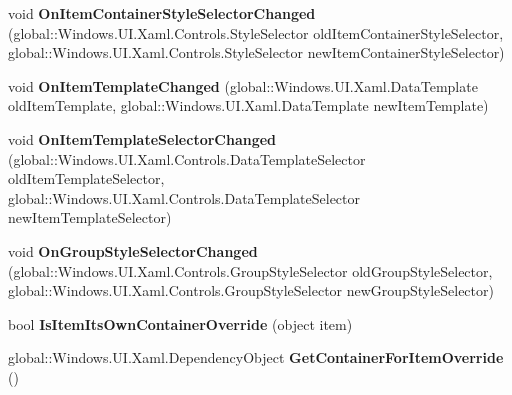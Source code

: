 \begin{DoxyCompactItemize}
void {\bfseries On\+Item\+Container\+Style\+Selector\+Changed} (global\+::\+Windows.\+U\+I.\+Xaml.\+Controls.\+Style\+Selector old\+Item\+Container\+Style\+Selector, global\+::\+Windows.\+U\+I.\+Xaml.\+Controls.\+Style\+Selector new\+Item\+Container\+Style\+Selector)
\item 
\mbox{\label{interface_windows_1_1_u_i_1_1_xaml_1_1_controls_1_1_i_items_control_overrides_ac592214833c559a28551ba9ccb0b4d2a}} 
void {\bfseries On\+Item\+Template\+Changed} (global\+::\+Windows.\+U\+I.\+Xaml.\+Data\+Template old\+Item\+Template, global\+::\+Windows.\+U\+I.\+Xaml.\+Data\+Template new\+Item\+Template)
\item 
\mbox{\label{interface_windows_1_1_u_i_1_1_xaml_1_1_controls_1_1_i_items_control_overrides_a30660077603ff4ebf8b8f749780afbd1}} 
void {\bfseries On\+Item\+Template\+Selector\+Changed} (global\+::\+Windows.\+U\+I.\+Xaml.\+Controls.\+Data\+Template\+Selector old\+Item\+Template\+Selector, global\+::\+Windows.\+U\+I.\+Xaml.\+Controls.\+Data\+Template\+Selector new\+Item\+Template\+Selector)
\item 
\mbox{\label{interface_windows_1_1_u_i_1_1_xaml_1_1_controls_1_1_i_items_control_overrides_ac04335f529637477b2da0ba46ef61142}} 
void {\bfseries On\+Group\+Style\+Selector\+Changed} (global\+::\+Windows.\+U\+I.\+Xaml.\+Controls.\+Group\+Style\+Selector old\+Group\+Style\+Selector, global\+::\+Windows.\+U\+I.\+Xaml.\+Controls.\+Group\+Style\+Selector new\+Group\+Style\+Selector)
\item 
\mbox{\label{interface_windows_1_1_u_i_1_1_xaml_1_1_controls_1_1_i_items_control_overrides_ad9d9073fc349d2a457c581129484ff0f}} 
bool {\bfseries Is\+Item\+Its\+Own\+Container\+Override} (object item)
\item 
\mbox{\label{interface_windows_1_1_u_i_1_1_xaml_1_1_controls_1_1_i_items_control_overrides_a623f7e1da828fb4e0ab4990fc2047874}} 
global\+::\+Windows.\+U\+I.\+Xaml.\+Dependency\+Object {\bfseries Get\+Container\+For\+Item\+Override} ()

\end{DoxyCompactItemize}
